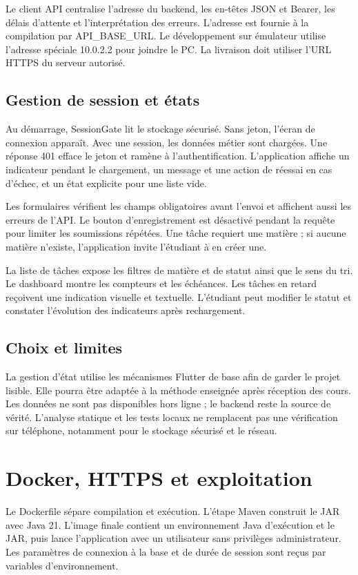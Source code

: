 \documentclass[11pt,a4paper]{article}
\begin{document}
Le client API centralise l'adresse du backend, les en-têtes JSON et Bearer, les délais d'attente et l'interprétation des erreurs. L'adresse est fournie à la compilation par API\_BASE\_URL. Le développement sur émulateur utilise l'adresse spéciale 10.0.2.2 pour joindre le PC. La livraison doit utiliser l'URL HTTPS du serveur autorisé.

\subsection*{Gestion de session et états}
Au démarrage, SessionGate lit le stockage sécurisé. Sans jeton, l'écran de connexion apparaît. Avec une session, les données métier sont chargées. Une réponse 401 efface le jeton et ramène à l'authentification. L'application affiche un indicateur pendant le chargement, un message et une action de réessai en cas d'échec, et un état explicite pour une liste vide.

Les formulaires vérifient les champs obligatoires avant l'envoi et affichent aussi les erreurs de l'API. Le bouton d'enregistrement est désactivé pendant la requête pour limiter les soumissions répétées. Une tâche requiert une matière ; si aucune matière n'existe, l'application invite l'étudiant à en créer une.

La liste de tâches expose les filtres de matière et de statut ainsi que le sens du tri. Le dashboard montre les compteurs et les échéances. Les tâches en retard reçoivent une indication visuelle et textuelle. L'étudiant peut modifier le statut et constater l'évolution des indicateurs après rechargement.

\subsection*{Choix et limites}
La gestion d'état utilise les mécanismes Flutter de base afin de garder le projet lisible. Elle pourra être adaptée à la méthode enseignée après réception des cours. Les données ne sont pas disponibles hors ligne ; le backend reste la source de vérité. L'analyse statique et les tests locaux ne remplacent pas une vérification sur téléphone, notamment pour le stockage sécurisé et le réseau.
\newpage
\section{Docker, HTTPS et exploitation}
Le Dockerfile sépare compilation et exécution. L'étape Maven construit le JAR avec Java 21. L'image finale contient un environnement Java d'exécution et le JAR, puis lance l'application avec un utilisateur sans privilèges administrateur. Les paramètres de connexion à la base et de durée de session sont reçus par variables d'environnement.
\end{document}
